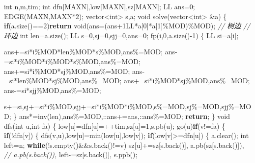 \documentclass[
]{article}
\newenvironment{Shaded}{}{}
\newcommand{\BuiltInTok}[1]{#1}
\newcommand{\CommentTok}[1]{\textcolor[rgb]{0.38,0.63,0.69}{\textit{#1}}}
\newcommand{\ControlFlowTok}[1]{\textcolor[rgb]{0.00,0.44,0.13}{\textbf{#1}}}
\newcommand{\DataTypeTok}[1]{\textcolor[rgb]{0.56,0.13,0.00}{#1}}
\newcommand{\DecValTok}[1]{\textcolor[rgb]{0.25,0.63,0.44}{#1}}
\newcommand{\NormalTok}[1]{#1}
\begin{document}
\begin{Shaded}
\begin{Highlighting}[]
\DataTypeTok{int}\NormalTok{ n,m,tim;}
\DataTypeTok{int}\NormalTok{ dfn[MAXN],low[MAXN],sz[MAXN];}
\NormalTok{LL ans=}\DecValTok{0}\NormalTok{;}
\NormalTok{EDGE(MAXN,MAXN*}\DecValTok{2}\NormalTok{);}
\NormalTok{vector\textless{}}\DataTypeTok{int}\NormalTok{\textgreater{} s,a;}
\DataTypeTok{void}\NormalTok{ solve(vector\textless{}}\DataTypeTok{int}\NormalTok{\textgreater{} \&a)}
\NormalTok{\{}
    \ControlFlowTok{if}\NormalTok{(a.size()==}\DecValTok{2}\NormalTok{)}\ControlFlowTok{return} \DataTypeTok{void}\NormalTok{(ans=(ans+}\DecValTok{1}\BuiltInTok{LL}\NormalTok{*a[}\DecValTok{0}\NormalTok{]*a[}\DecValTok{1}\NormalTok{]\%MOD)\%MOD); }\CommentTok{// 树边}
    \CommentTok{// 环边    }
    \DataTypeTok{int}\NormalTok{ len=a.size(); LL s=}\DecValTok{0}\NormalTok{,sj=}\DecValTok{0}\NormalTok{,sjj=}\DecValTok{0}\NormalTok{,ans=}\DecValTok{0}\NormalTok{; }
\NormalTok{    fp(i,}\DecValTok{0}\NormalTok{,a.size(){-}}\DecValTok{1}\NormalTok{)}
\NormalTok{    \{}
\NormalTok{        LL si=a[i];}

\NormalTok{        ans+=si*i\%MOD*len\%MOD*s\%MOD,ans\%=MOD;}
\NormalTok{        ans{-}=si*i\%MOD*i\%MOD*s\%MOD,ans\%=MOD;}
\NormalTok{        ans+=si*i\%MOD*sj\%MOD,ans\%=MOD;}
\NormalTok{        ans{-}=si*len\%MOD*sj\%MOD,ans\%=MOD;}
\NormalTok{        ans+=si*i\%MOD*sj\%MOD,ans\%=MOD;}
\NormalTok{        ans{-}=si*sjj\%MOD,ans\%=MOD;}
        
\NormalTok{        s+=si,sj+=si*i\%MOD,sjj+=si*i\%MOD*i\%MOD,s\%=MOD,sj\%=MOD,sjj\%=MOD;}
\NormalTok{    \}}
\NormalTok{    ans*=inv(len),ans\%=MOD,::ans+=ans,::ans\%=MOD; }\ControlFlowTok{return}\NormalTok{;}
\NormalTok{\}}
\DataTypeTok{void}\NormalTok{ dfs(}\DataTypeTok{int}\NormalTok{ u,}\DataTypeTok{int}\NormalTok{ fa)}
\NormalTok{\{}
\NormalTok{    low[u]=dfn[u]=++tim,sz[u]=}\DecValTok{1}\NormalTok{,s.pb(u);}
\NormalTok{    go(u)}\ControlFlowTok{if}\NormalTok{(v!=fa)}
\NormalTok{    \{}
        \ControlFlowTok{if}\NormalTok{(!dfn[v])}
\NormalTok{        \{}
\NormalTok{            dfs(v,u),low[u]=min(low[u],low[v]);}
            \ControlFlowTok{if}\NormalTok{(low[v]\textgreater{}=dfn[u])}
\NormalTok{            \{}
\NormalTok{                a.clear(); }\DataTypeTok{int}\NormalTok{ left=n;}
                \ControlFlowTok{while}\NormalTok{(!s.empty()\&\&s.back()!=v)}
\NormalTok{                    sz[u]+=sz[s.back()],}
\NormalTok{                    a.pb(sz[s.back()]), }\CommentTok{// a.pb(s.back()),}
\NormalTok{                    left{-}=sz[s.back()],}
\NormalTok{                    s.ppb();}
                

\end{Highlighting}
\end{Shaded}
\end{document}

